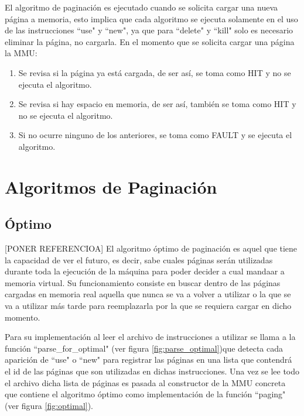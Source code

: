 \documentclass{report}
\begin{document}
El algoritmo de paginación es ejecutado cuando se solicita cargar una nueva página a memoria, esto implica que cada algoritmo se ejecuta solamente en el uso de las instrucciones ``use" y ``new", ya que para ``delete" y ``kill" solo es necesario eliminar la página, no cargarla.
En el momento que se solicita cargar una página la MMU:
\begin{enumerate}
    \item Se revisa si la página ya está cargada, de ser así, se toma como HIT y no se ejecuta el algoritmo.
    \item Se revisa si hay espacio en memoria, de ser así, también se toma como HIT y no se ejecuta el algoritmo. 
    \item Si no ocurre ninguno de los anteriores, se toma como FAULT y se ejecuta el algoritmo.
\end{enumerate}


\section {Algoritmos de Paginación}

\subsection{Óptimo}
[PONER REFERENCIOA]
El algoritmo óptimo de paginación es aquel que tiene la capacidad de ver el futuro, es decir, sabe cuales páginas serán utilizadas durante toda la ejecución de la máquina para poder decider a cual mandaar a memoria virtual. Su funcionamiento consiste en buscar dentro de las páginas cargadas en memoria real aquella que nunca se va a volver a utilizar o la que se va a utilizar más tarde para reemplazarla por la que se requiera cargar en dicho momento. 

Para su implementación al leer el archivo de instrucciones a utilizar se llama a la función ``parse\_for\_optimal" (ver figura \ref{fig:parse_optimal})que detecta cada aparición de ``use" o ``new" para registrar las páginas en una lista que contendrá el id de las páginas que son utilizadas en dichas instrucciones. Una vez se lee todo el archivo dicha lista de páginas es pasada al constructor de la MMU concreta que contiene el algoritmo óptimo como implementación de la función ``paging" (ver figura \ref{fig:optimal}).
\end{document}
